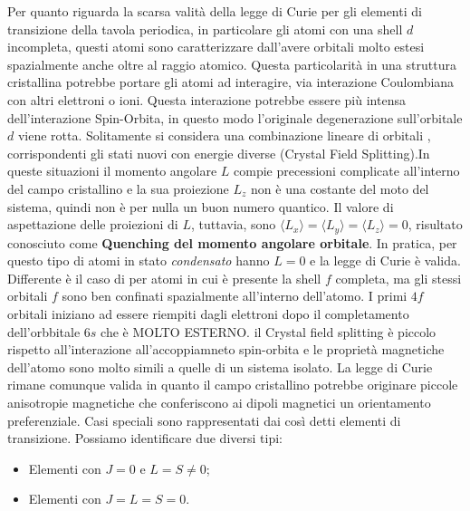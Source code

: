 Per quanto riguarda la scarsa valit\`a della legge di Curie per gli elementi di transizione della tavola periodica, in particolare gli atomi con una shell $d$ incompleta, questi atomi sono caratterizzare dall'avere orbitali molto estesi spazialmente anche oltre al raggio atomico. Questa particolarit\`a in una struttura cristallina potrebbe portare gli atomi ad interagire, via interazione Coulombiana con altri elettroni o ioni. Questa interazione potrebbe essere pi\`u intensa dell'interazione Spin-Orbita, in questo modo l'originale degenerazione sull'orbitale $d$ viene rotta.
Solitamente si considera una combinazione lineare di orbitali , corrispondenti gli stati nuovi con energie diverse (Crystal Field Splitting).In queste situazioni il momento angolare $L$ compie precessioni complicate all'interno del campo cristallino e la sua proiezione $L_z$ non \`e una costante del moto del sistema, quindi non \`e per nulla un buon numero quantico. Il valore di aspettazione delle proiezioni di $L$, tuttavia, sono $\langle L_x \rangle = \langle L_y \rangle = \langle L_z \rangle = 0$, risultato conosciuto come \textbf{Quenching del momento angolare orbitale}.
In pratica, per questo tipo di atomi in stato \textit{condensato} hanno $L=0$ e la legge di Curie \`e valida. Differente \`e il caso di per atomi in cui \`e presente la shell $f$ completa, ma gli stessi orbitali $f$ sono ben confinati spazialmente all'interno dell'atomo. I primi $4f$ orbitali iniziano ad essere riempiti dagli elettroni dopo il completamento dell'orbbitale $6s$ che \`e MOLTO ESTERNO. il Crystal field splitting \`e piccolo rispetto all'interazione all'accoppiamneto spin-orbita e le propriet\`a magnetiche dell'atomo sono molto simili a quelle di un sistema isolato. La legge di Curie rimane comunque valida in quanto il campo cristallino potrebbe originare piccole anisotropie magnetiche che conferiscono ai dipoli magnetici un orientamento preferenziale.
Casi speciali sono rappresentati dai cos\`i detti elementi di transizione. Possiamo identificare due diversi tipi:
\begin{itemize}
	\item Elementi con $J=0$ e $L = S \neq 0$;
	\item Elementi con $J = L = S = 0$.
\end{itemize}
